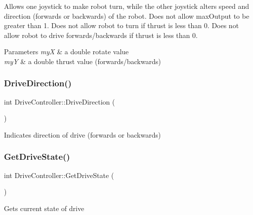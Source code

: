 Allows one joystick to make robot turn, while the other joystick alters speed and direction (forwards or backwards) of the robot. Does not allow max\+Output to be greater than 1. Does not allow robot to turn if thrust is less than 0. Does not allow robot to drive forwards/backwards if thrust is less than 0. 
\begin{DoxyParams}{Parameters}
{\em myX} & a double rotate value \\
\hline
{\em myY} & a double thrust value (forwards/backwards) \\
\hline
\end{DoxyParams}
\mbox{\label{class_drive_controller_aeecbfd3643cadb19cc30af0f22c41c98}} 
\subsubsection{\texorpdfstring{Drive\+Direction()}{DriveDirection()}}
{\footnotesize\ttfamily int Drive\+Controller\+::\+Drive\+Direction (\begin{DoxyParamCaption}{ }\end{DoxyParamCaption})\hspace{0.3cm}{\ttfamily [private]}}

Indicates direction of drive (forwards or backwards) \mbox{\label{class_drive_controller_a001ab748cefcfdb9d4aa10b3cf699d53}} 
\subsubsection{\texorpdfstring{Get\+Drive\+State()}{GetDriveState()}}
{\footnotesize\ttfamily int Drive\+Controller\+::\+Get\+Drive\+State (\begin{DoxyParamCaption}{ }\end{DoxyParamCaption})\hspace{0.3cm}{\ttfamily [private]}}

Gets current state of drive \mbox{\label{class_drive_controller_ae07d828e9b1738bd0baf6dca46e5bd5c}} 
